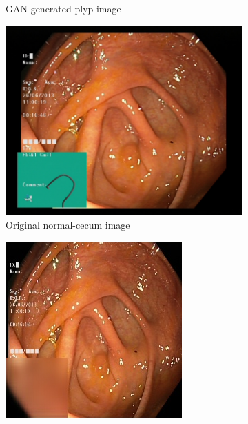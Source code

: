 \begin{figure}[h]
\begin{subfigure}[t]{\myfigsizethree}
            \caption{GAN generated plyp image}    
            \label{fig:polyp_GAN_SQUARE2}
        \end{subfigure}
        \qquad\vfill%
        \begin{subfigure}[t]{\myfigsizethree}   
            \centering 
            \includegraphics[height=\textwidth, width=\textwidth]{experiments/figures/greensquare/ncORIG.jpg}
            \caption{Original normal-cecum image}   
            \label{fig:nc_ORIG_SQUARE2}
        \end{subfigure}
        \qquad
        \begin{subfigure}[t]{\myfigsizethree}   
            \centering 
            \includegraphics[width=\textwidth]{experiments/figures/greensquare/ncAE.jpg}

\end{subfigure}
\end{figure}
